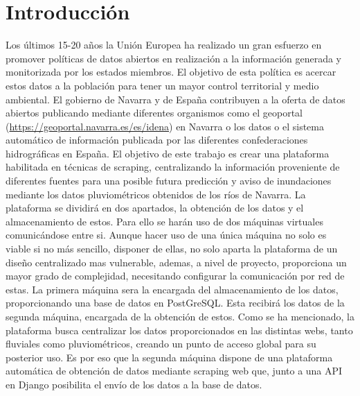 \chapter[Introducción]{Introducción}
\label{Chap1}

Los últimos 15-20 años la Unión Europea ha realizado un gran esfuerzo en promover políticas de datos abiertos en realización a la información generada y monitorizada por los estados miembros. El objetivo de esta política es acercar estos datos a la población para tener un mayor control territorial y medio ambiental. El gobierno de Navarra y de España contribuyen a la oferta de datos abiertos publicando mediante diferentes organismos como el geoportal (\url{https://geoportal.navarra.es/es/idena}) en Navarra o los datos o el sistema automático de información publicada por las diferentes confederaciones hidrográficas en España.\newline
\newline
El objetivo de este trabajo es crear una plataforma habilitada en técnicas de scraping, centralizando la información proveniente de diferentes fuentes para una posible futura predicción y aviso de inundaciones mediante los datos pluviométricos obtenidos de los ríos de Navarra.\newline
\newline
La plataforma se dividirá en dos apartados, la obtención de los datos y el almacenamiento de estos. Para ello se harán uso de dos máquinas virtuales comunicándose entre si. Aunque hacer uso de una única máquina no solo es viable si no más sencillo, disponer de ellas, no solo aparta la plataforma de un diseño centralizado mas vulnerable, ademas, a nivel de proyecto, proporciona un mayor grado de complejidad, necesitando configurar la comunicación por red de estas.\newline
\newline
La primera máquina sera la encargada del almacenamiento de los datos, proporcionando una base de datos en PostGreSQL. Esta recibirá los datos de la segunda máquina, encargada de la obtención de estos.\newline
\newline
Como se ha mencionado, la plataforma busca centralizar los datos proporcionados en las distintas webs, tanto fluviales como pluviométricos, creando un punto de acceso global para su posterior uso. Es por eso que la segunda máquina dispone de una plataforma automática de obtención de datos mediante scraping web que, junto a una API en Django posibilita el envío de los datos a la base de datos.\newline
